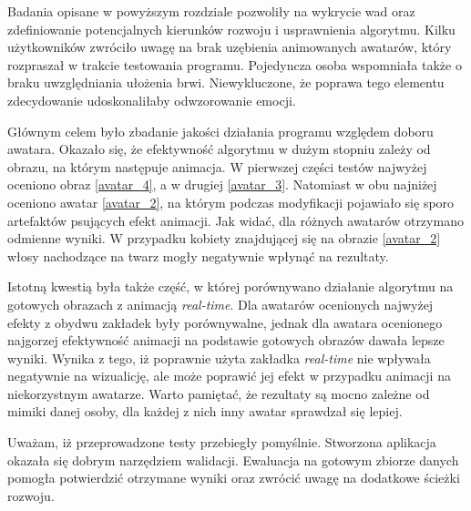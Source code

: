 Badania opisane w powyższym rozdziale pozwoliły na wykrycie wad oraz zdefiniowanie potencjalnych kierunków rozwoju i usprawnienia algorytmu. Kilku użytkowników zwróciło uwagę na brak uzębienia animowanych awatarów, który rozpraszał w trakcie testowania programu. Pojedyncza osoba wspomniała także o braku uwzględniania ułożenia brwi. Niewykluczone, że poprawa tego elementu zdecydowanie udoskonaliłaby odwzorowanie emocji.

Głównym celem było zbadanie jakości działania programu względem doboru awatara. Okazało się, że efektywność algorytmu w dużym stopniu zależy od obrazu, na którym następuje animacja. W pierwszej części testów najwyżej oceniono obraz \ref{avatar_4}, a w drugiej \ref{avatar_3}. Natomiast w obu najniżej oceniono awatar \ref{avatar_2}, na którym podczas modyfikacji pojawiało się sporo artefaktów psujących efekt animacji. Jak widać, dla różnych awatarów otrzymano odmienne wyniki. W przypadku kobiety znajdującej się na obrazie \ref{avatar_2} włosy nachodzące na twarz mogły negatywnie wpłynąć na rezultaty.

Istotną kwestią była także część, w której porównywano działanie algorytmu na gotowych obrazach z animacją \textit{real-time}. Dla awatarów ocenionych najwyżej efekty z obydwu zakładek były porównywalne, jednak dla awatara ocenionego najgorzej efektywność animacji na podstawie gotowych obrazów dawała lepsze wyniki. Wynika z tego, iż poprawnie użyta zakładka \textit{real-time} nie wpływała negatywnie na wizualicję, ale może poprawić jej efekt w przypadku animacji na niekorzystnym awatarze. Warto pamiętać, że rezultaty są mocno zależne od mimiki danej osoby, dla każdej z nich inny awatar sprawdzał się lepiej. 

Uważam, iż przeprowadzone testy przebiegły pomyślnie. Stworzona aplikacja okazała się dobrym narzędziem walidacji. Ewaluacja na gotowym zbiorze danych pomogła potwierdzić otrzymane wyniki oraz zwrócić uwagę na dodatkowe ścieżki rozwoju.



